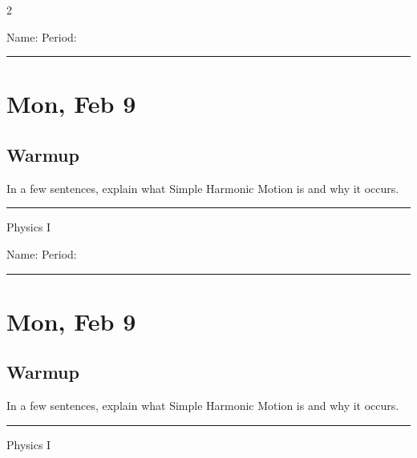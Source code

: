 \documentclass[10pt,landscape]{exam}
\def\todayDate{Mon, Feb 9}
\def\content{
In a few sentences, explain what Simple Harmonic Motion is and why it occurs.
}
\begin{document}
\pagestyle{empty}

\setlength{\columnsep}{0.8in}
\begin{multicols*}{2}

\noindent  
Name: \hfill Period: \hspace{5em}
\vspace{0.5em}
\hrule

\section*{\todayDate}
\subsection*{Warmup}

\content

\vfill
\hrule
\vspace{0.5em}
\hfill {\sc Physics I}

\columnbreak

\noindent  
Name: \hfill Period: \hspace{5em}
\vspace{0.5em}
\hrule

\section*{\todayDate}
\subsection*{Warmup}

\content

\vfill
\hrule
\vspace{0.5em}
\hfill {\sc Physics I}

\end{multicols*}
\end{document}
